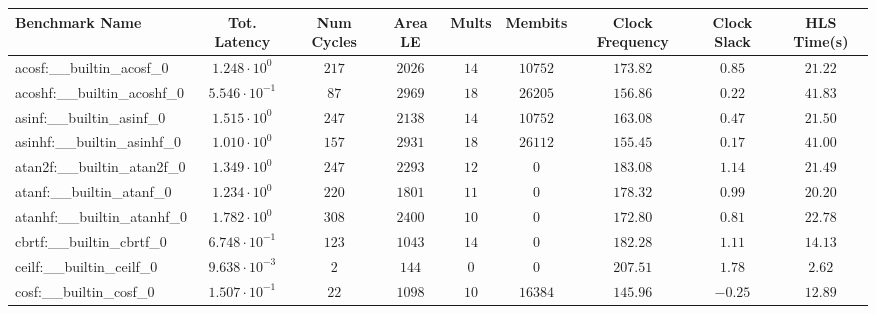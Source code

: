 \begin{tabular}{|l|c|c|c|c|c|c|c|c|}
\hline
Benchmark Name                            & Tot. Latency            & Num Cycles & Area LE   & Mults   & Membits    & Clock Frequency & Clock Slack & HLS Time(s) \\
\hline
acosf:\_\_builtin\_acosf\_0               & $ 1.248 \cdot 10^{0}  $ & $ 217    $ & $ 2026  $ & $ 14  $ & $ 10752  $ & $ 173.82      $ & $ 0.85    $ & $ 21.22   $ \\
acoshf:\_\_builtin\_acoshf\_0             & $ 5.546 \cdot 10^{-1} $ & $ 87     $ & $ 2969  $ & $ 18  $ & $ 26205  $ & $ 156.86      $ & $ 0.22    $ & $ 41.83   $ \\
asinf:\_\_builtin\_asinf\_0               & $ 1.515 \cdot 10^{0}  $ & $ 247    $ & $ 2138  $ & $ 14  $ & $ 10752  $ & $ 163.08      $ & $ 0.47    $ & $ 21.50   $ \\
asinhf:\_\_builtin\_asinhf\_0             & $ 1.010 \cdot 10^{0}  $ & $ 157    $ & $ 2931  $ & $ 18  $ & $ 26112  $ & $ 155.45      $ & $ 0.17    $ & $ 41.00   $ \\
atan2f:\_\_builtin\_atan2f\_0             & $ 1.349 \cdot 10^{0}  $ & $ 247    $ & $ 2293  $ & $ 12  $ & $ 0      $ & $ 183.08      $ & $ 1.14    $ & $ 21.49   $ \\
atanf:\_\_builtin\_atanf\_0               & $ 1.234 \cdot 10^{0}  $ & $ 220    $ & $ 1801  $ & $ 11  $ & $ 0      $ & $ 178.32      $ & $ 0.99    $ & $ 20.20   $ \\
atanhf:\_\_builtin\_atanhf\_0             & $ 1.782 \cdot 10^{0}  $ & $ 308    $ & $ 2400  $ & $ 10  $ & $ 0      $ & $ 172.80      $ & $ 0.81    $ & $ 22.78   $ \\
cbrtf:\_\_builtin\_cbrtf\_0               & $ 6.748 \cdot 10^{-1} $ & $ 123    $ & $ 1043  $ & $ 14  $ & $ 0      $ & $ 182.28      $ & $ 1.11    $ & $ 14.13   $ \\
ceilf:\_\_builtin\_ceilf\_0               & $ 9.638 \cdot 10^{-3} $ & $ 2      $ & $ 144   $ & $ 0   $ & $ 0      $ & $ 207.51      $ & $ 1.78    $ & $ 2.62    $ \\
cosf:\_\_builtin\_cosf\_0                 & $ 1.507 \cdot 10^{-1} $ & $ 22     $ & $ 1098  $ & $ 10  $ & $ 16384  $ & $ 145.96      $ & $ -0.25   $ & $ 12.89   $ \\

\end{tabular}
